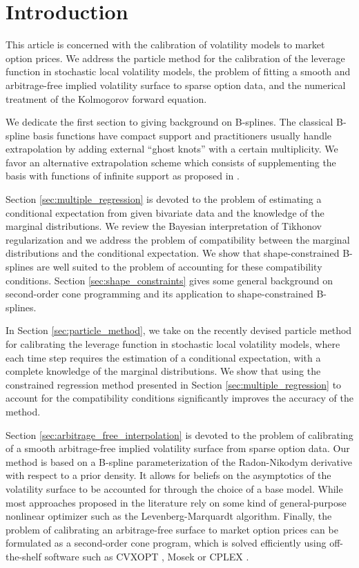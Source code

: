 \documentclass[a4paper]{article}
\newcommand{\1}{\textbf{1}}
\begin{document}
\section*{Introduction}
\par This article is concerned with the calibration of volatility models to market option prices. We address the particle method for the calibration of the leverage function in stochastic local volatility models, the problem of fitting a smooth and arbitrage-free implied volatility surface to sparse option data, and the numerical treatment of the Kolmogorov forward equation.
\par We dedicate the first section to giving background on B-splines. The classical B-spline basis functions have compact support and practitioners usually handle extrapolation by adding external ``ghost knots'' with a certain multiplicity. We favor an alternative extrapolation scheme which consists of supplementing the basis with functions of infinite support as proposed in \cite{SchumakerSplineBook}. 
\par Section \ref{sec:multiple_regression} is devoted to the problem of estimating a conditional expectation from given bivariate data and the knowledge of the marginal distributions. We review the Bayesian interpretation of Tikhonov regularization and we address the problem of compatibility between the marginal distributions and the conditional expectation. We show that shape-constrained B-splines are well suited to the problem of accounting for these compatibility conditions. Section \ref{sec:shape_constraints} gives some general background on second-order cone programming and its application to shape-constrained B-splines. 
\par In Section \ref{sec:particle_method}, we take on the recently devised particle method for calibrating the leverage function in stochastic local volatility models, where each time step requires the estimation of a conditional expectation, with a complete knowledge of the marginal distributions. We show that using the constrained regression method presented in Section \ref{sec:multiple_regression} to account for the compatibility conditions significantly improves the accuracy of the method.
\par Section \ref{sec:arbitrage_free_interpolation} is devoted to the problem of calibrating of a smooth arbitrage-free implied volatility surface from sparse option data. Our method is based on a B-spline parameterization of the Radon-Nikodym derivative with respect to a prior density. It allows for beliefs on the asymptotics of the volatility surface to be accounted for through the choice of a base model. While most approaches proposed in the literature rely on some kind of general-purpose nonlinear optimizer such as the Levenberg-Marquardt algorithm. Finally, the problem of calibrating an arbitrage-free surface to market option prices can be formulated as a second-order cone program, which is solved efficiently using off-the-shelf software such as CVXOPT \cite{cvxopt}, Mosek \cite{mosek} or CPLEX \cite{ilogcplex}. 
\end{document}
